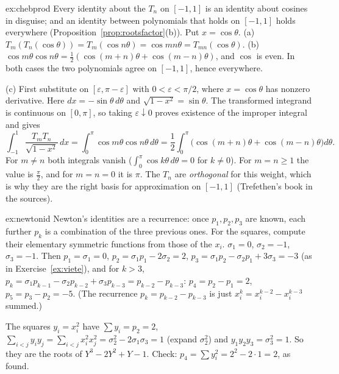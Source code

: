 \begin{solution}{ex:chebprod}
\idea Every identity about the $T_n$ on $[-1,1]$ is an identity about cosines in disguise; and an identity between polynomials that holds on $[-1,1]$ holds everywhere (Proposition~\ref{prop:rootsfactor}(b)).
\writeup Put $x=\cos\theta$. (a) $T_m(T_n(\cos\theta))=T_m(\cos n\theta)=\cos mn\theta=T_{mn}(\cos\theta)$. (b) $\cos m\theta\cos n\theta=\frac12(\cos(m+n)\theta+\cos(m-n)\theta)$, and $\cos$ is even. In both cases the two polynomials agree on $[-1,1]$, hence everywhere.

(c) First substitute on $[\varepsilon,\pi-\varepsilon]$ with $0<\varepsilon<\pi/2$, where $x=\cos\theta$ has nonzero derivative. Here $dx=-\sin\theta\,d\theta$ and $\sqrt{1-x^2}=\sin\theta$. The transformed integrand is continuous on $[0,\pi]$, so taking $\varepsilon\downarrow0$ proves existence of the improper integral and gives
\[
\int_{-1}^1\frac{T_mT_n}{\sqrt{1-x^2}}\,dx=\int_0^\pi\cos m\theta\cos n\theta\,d\theta=\frac12\int_0^\pi\bigl(\cos(m+n)\theta+\cos(m-n)\theta\bigr)d\theta.
\]
For $m\ne n$ both integrals vanish ($\int_0^\pi\cos k\theta\,d\theta=0$ for $k\ne0$). For $m=n\ge1$ the value is $\frac\pi2$, and for $m=n=0$ it is $\pi$.
The $T_n$ are \emph{orthogonal} for this weight, which is why they are the right basis for approximation on $[-1,1]$ (Trefethen's book in the sources).
\end{solution}

\begin{solution}{ex:newtonid}
\idea Newton's identities are a recurrence: once $p_1,p_2,p_3$ are known, each further $p_k$ is a combination of the three previous ones. For the squares, compute their elementary symmetric functions from those of the $x_i$.
\writeup $\sigma_1=0$, $\sigma_2=-1$, $\sigma_3=-1$. Then $p_1=\sigma_1=0$, $p_2=\sigma_1p_1-2\sigma_2=2$, $p_3=\sigma_1p_2-\sigma_2p_1+3\sigma_3=-3$ (as in Exercise~\ref{ex:viete}), and for $k>3$, $p_k=\sigma_1p_{k-1}-\sigma_2p_{k-2}+\sigma_3p_{k-3}=p_{k-2}-p_{k-3}$:
$p_4=p_2-p_1=2$, $p_5=p_3-p_2=-5$. (The recurrence $p_k=p_{k-2}-p_{k-3}$ is just $x_i^k=x_i^{k-2}-x_i^{k-3}$ summed.)

The squares $y_i=x_i^2$ have $\sum y_i=p_2=2$, $\sum_{i<j}y_iy_j=\sum_{i<j}x_i^2x_j^2=\sigma_2^2-2\sigma_1\sigma_3=1$ (expand $\sigma_2^2$) and $y_1y_2y_3=\sigma_3^2=1$. So they are the roots of $Y^3-2Y^2+Y-1$. Check: $p_4=\sum y_i^2=2^2-2\cdot1=2$, as found.
\end{solution}

